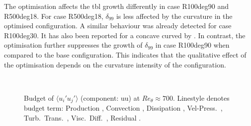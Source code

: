 The optimisation affects the \acrshort{tbl} growth differently in case R100deg90 and R500deg18.
For case R500deg18, $\delta_{99}$ is less affected by the curvature in the optimised configuration.
A similar behaviour was already detected for case R100deg30. It  
has also been reported for a concave curved     by \citet{appelbaum_systematic_2025}.
In contrast,  the optimisation further suppresses the growth of   $\delta_{99}$ in case R100deg90 when  compared to the base configuration.
This indicates that the qualitative effect of the optimisation depends on the curvature intensity of the configuration.

\begin{figure}[H]
\centering
\begin{subfigure}[t]{0.495\textwidth}
    \subcaption{}
    \centering
    
    \label{fig:R500deg18R100deg90_beta}
\end{subfigure}
\hfill
\begin{subfigure}[t]{0.495\textwidth}
    \centering
    \subcaption{}
    
    \label{fig:R500deg18R100deg90_cf}
\end{subfigure}
\\[-20pt]
\begin{subfigure}[t]{0.495\textwidth}
    \centering
    \subcaption{}
    
    \label{fig:R500deg18R100deg90_pres}
\end{subfigure}
\hfill
\begin{subfigure}[t]{0.495\textwidth}
    \centering
    \subcaption{}
    
    \label{fig:R500deg18R100deg90_Ue}
\end{subfigure}
\caption{Budget of $\langle u_i' u_j' \rangle$ (component: uu) at $Re_\theta \approx 700$.
Linestyle denotes budget term:
Production ,
Convection ,
Dissipation ,
Vel-Press.\ ,
Turb.\ Trans.\ ,
Visc.\ Diff.\ ,
Residual .}
\label{fig:R500deg18R100deg90}
\end{figure}



